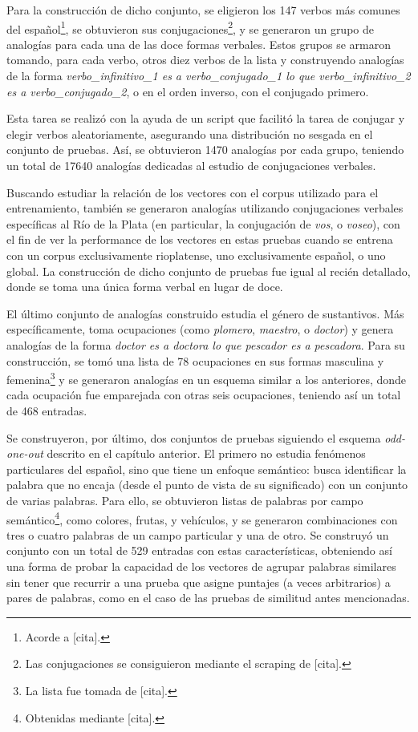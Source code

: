 Para la construcción de dicho conjunto, se eligieron los 147 verbos más comunes del
español\footnote{Acorde a [cita].}, se obtuvieron sus conjugaciones\footnote{Las conjugaciones se
consiguieron mediante el scraping de [cita].}, y se generaron un grupo de analogías para cada una de
las doce formas verbales. Estos grupos se armaron tomando, para cada verbo, otros diez verbos de la
lista y construyendo analogías de la forma \textit{verbo\_infinitivo\_1 es a verbo\_conjugado\_1 lo
que verbo\_infinitivo\_2 es a verbo\_conjugado\_2}, o en el orden inverso, con el conjugado primero.

Esta tarea se realizó con la ayuda de un script que facilitó la tarea de conjugar y elegir verbos
aleatoriamente, asegurando una distribución no sesgada en el conjunto de pruebas. Así, se obtuvieron
1470 analogías por cada grupo, teniendo un total de 17640 analogías dedicadas al estudio de
conjugaciones verbales.


Buscando estudiar la relación de los vectores con el corpus utilizado para el entrenamiento, también
se generaron analogías utilizando conjugaciones verbales específicas al Río de la Plata (en
particular, la conjugación de \textit{vos}, o \textit{voseo}), con el fin de ver la performance de
los vectores en estas pruebas cuando se entrena con un corpus exclusivamente rioplatense, uno
exclusivamente español, o uno global. La construcción de dicho conjunto de pruebas fue igual al
recién detallado, donde se toma una única forma verbal en lugar de doce.


El último conjunto de analogías construido estudia el género de sustantivos. Más específicamente,
toma ocupaciones (como \textit{plomero}, \textit{maestro}, o \textit{doctor}) y genera analogías de
la forma \textit{doctor es a doctora lo que pescador es a pescadora}. Para su construcción, se tomó
una lista de 78 ocupaciones en sus formas masculina y femenina\footnote{La lista fue tomada de
[cita].} y se generaron analogías en un esquema similar a los anteriores, donde cada ocupación fue
emparejada con otras seis ocupaciones, teniendo así un total de 468 entradas.


Se construyeron, por último, dos conjuntos de pruebas siguiendo el esquema \textit{odd-one-out}
descrito en el capítulo anterior. El primero no estudia fenómenos particulares del español, sino que
tiene un enfoque semántico: busca identificar la palabra que no encaja (desde el punto de vista de
su significado) con un conjunto de varias palabras. Para ello, se obtuvieron listas de palabras por
campo semántico\footnote{Obtenidas mediante [cita].}, como colores, frutas, y vehículos, y se
generaron combinaciones con tres o cuatro palabras de un campo particular y una de otro. Se
construyó un conjunto con un total de 529 entradas con estas características, obteniendo así una
forma de probar la capacidad de los vectores de agrupar palabras similares sin tener que recurrir a
una prueba que asigne puntajes (a veces arbitrarios) a pares de palabras, como en el caso de las
pruebas de similitud antes mencionadas.

